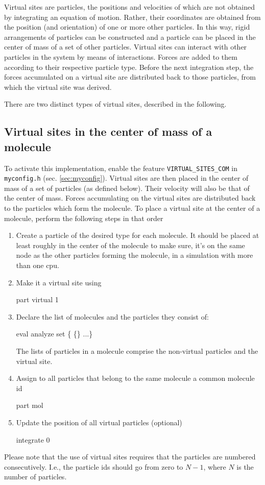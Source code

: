 Virtual sites are particles, the positions and velocities of which are
not obtained by integrating an equation of motion.  Rather, their
coordinates are obtained from the position (and orientation) of one or
more other particles. In this way, rigid arrangements of particles can
be constructed and a particle can be placed in the center of mass of a
set of other particles.  Virtual sites can interact with other
particles in the system by means of interactions. Forces are added to
them according to their respective particle type. Before the next
integration step, the forces accumulated on a virtual site are
distributed back to those particles, from which the virtual site was
derived.

There are two distinct types of virtual sites, described in the
following.

\subsection{Virtual sites in the center of mass of a molecule}

To activate this implementation, enable the feature
\texttt{VIRTUAL_SITES_COM} in \texttt{myconfig.h}
(sec. \ref{sec:myconfig}).  Virtual sites are then placed in the
center of mass of a set of particles (as defined below). Their
velocity will also be that of the center of mass. Forces accumulating
on the virtual sites are distributed back to the particles which form
the molecule.  To place a virtual site at the center of a molecule,
perform the following steps in that order
\begin{enumerate}
\item Create a particle of the desired type for each molecule. It
  should be placed at least roughly in the center of the molecule to
  make sure, it's on the same node as the other particles forming the
  molecule, in a simulation with more than one cpu.
\item Make it a virtual site using 
  \begin{essyntaxbox}
    part  virtual 1
  \end{essyntaxbox}
\item Declare the list of molecules and the particles they consist of:
  \begin{essyntaxbox}
    eval analyze set \{ \{\} ...\}
  \end{essyntaxbox}
  The lists of particles in a molecule comprise the non-virtual
  particles and the virtual site.
\item Assign to all particles that belong to the same molecule a
  common molecule id
  \begin{essyntaxbox}
    part  mol 
  \end{essyntaxbox}
\item Update the position of all virtual particles (optional)
  \begin{essyntaxbox}
    integrate 0
  \end{essyntaxbox}
\end{enumerate}
Please note that the use of virtual sites requires that the particles are numbered consecutively. I.e., the particle ids should go from zero to $N-1$, where $N$ is the number of particles.


